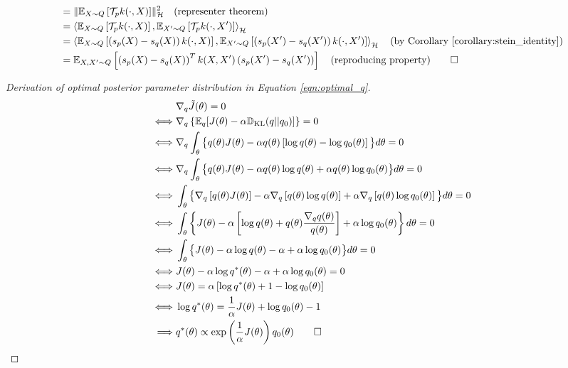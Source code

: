 \begin{derivation}
\begin{align*}
&= \lVert \mathbb{E}_{X \sim Q} \left[\mathcal{T}_p k(\cdot, X) \right] \rVert_{\mathcal{H}}^2 \quad \text{(representer theorem)}\\ %
&= \left \langle \mathbb{E}_{X \sim Q} \left[\mathcal{T}_p k(\cdot, X) \right], \mathbb{E}_{X' \sim Q} \left[\mathcal{T}_p k(\cdot, X') \right] \right \rangle_{\mathcal{H}}\\
&=  \left\langle \mathbb{E}_{X \sim Q} \left[\left(s_p(X) - s_q(X)\right) k(\cdot, X) \right], \mathbb{E}_{X' \sim Q} \left[\left(s_p(X') - s_q(X')\right) k(\cdot, X') \right] \right\rangle_{\mathcal{H}} \quad \text{(by Corollary \ref{corollary:stein_identity})}\\
&= \mathbb{E}_{X, X' \sim Q} \left[\left(s_p(X) - s_q(X)\right)^T k(X, X')\left(s_p(X') - s_q(X')\right) \right] \quad \text{(reproducing property)} \qedhere
\end{align*} 
\end{derivation}


\renewenvironment{derivation}
{\begin{proof}[Derivation of optimal posterior parameter distribution in Equation \ref{eqn:optimal_q}]\setlength{\parskip}{0.5em}}
{\end{proof}}
\begin{derivation}
\begin{align*}
&\nabla_q \tilde{J}(\theta) = 0\\
\iff & \nabla_q \left\{\mathbb{E}_q[J(\theta) - \alpha \mathbb{D}_{\text{KL}}(q||q_0)] \right\} = 0\\
\iff & \nabla_q \int_\theta \big\{q(\theta)J(\theta) - \alpha q(\theta) \left[\log q(\theta) - \log q_0(\theta)\right]\big\}d\theta = 0\\
\iff & \nabla_q \int_{\theta} \big\{q(\theta)J(\theta) - \alpha q(\theta) \log q(\theta) + \alpha q(\theta) \log q_0(\theta) \big\}d\theta = 0\\
\iff & \int_{\theta}\big\{\nabla_q \left[q(\theta) J(\theta)\right] - \alpha \nabla_q\left[ q(\theta) \log q(\theta)\right] + \alpha \nabla_q\left[q(\theta) \log q_0(\theta)\right]\big\}d\theta = 0\\
\iff & \int_\theta \left\{J(\theta) - \alpha \left[\log q(\theta) + q(\theta) \frac{\nabla_q q(\theta)}{q(\theta)} \right] + \alpha \log q_0(\theta) \right\}d\theta = 0\\
\iff & \int_\theta \big\{J(\theta) - \alpha \log q(\theta) - \alpha + \alpha \log q_0(\theta) \big\}d\theta = 0\\
\iff & J(\theta) - \alpha \log q^*(\theta) - \alpha + \alpha \log q_0(\theta) = 0\\
\iff & J(\theta) = \alpha \left[\log q^*(\theta) + 1 - \log q_0(\theta) \right]\\
\iff & \log q^*(\theta) = \frac{1}{\alpha}J(\theta) + \log q_0(\theta) - 1\\
\implies & q^*(\theta) \propto \exp \left(\frac{1}{\alpha}J(\theta) \right)q_0(\theta) \qedhere
\end{align*}
\end{derivation}


